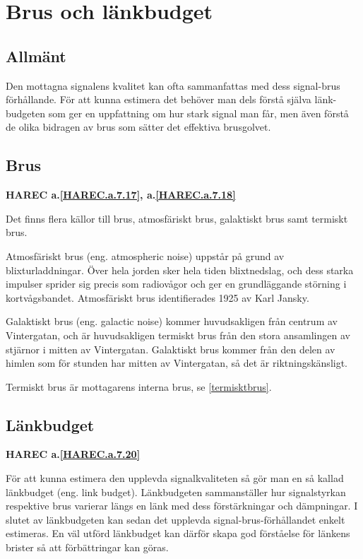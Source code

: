 \section{Brus och länkbudget}

\subsection{Allmänt}

Den mottagna signalens kvalitet kan ofta sammanfattas med dess signal-brus
förhållande.
För att kunna estimera det behöver man dels förstå själva länk-budgeten som
ger en uppfattning om hur stark signal man får, men även förstå de olika
bidragen av brus som sätter det effektiva brusgolvet.

\subsection{Brus}
\textbf{HAREC a.\ref{HAREC.a.7.17}\label{myHAREC.a.7.17}, a.\ref{HAREC.a.7.18}\label{myHAREC.a.7.18}}

Det finns flera källor till brus, atmosfäriskt brus, galaktiskt brus samt
termiskt brus.

Atmosfäriskt brus (eng. atmospheric noise) uppstår på grund av blixturladdningar.
Över hela jorden sker hela tiden blixtnedslag, och dess starka impulser sprider
sig precis som radiovågor och ger en grundläggande störning i kortvågsbandet.
Atmosfäriskt brus identifierades 1925 av Karl Jansky.

Galaktiskt brus (eng. galactic noise) kommer huvudsakligen från centrum av
Vintergatan, och är huvudsakligen termiskt brus från den stora ansamlingen av
stjärnor i mitten av Vintergatan.
Galaktiskt brus kommer från den delen av himlen som för stunden har mitten av
Vintergatan, så det är riktningskänsligt.

Termiskt brus är mottagarens interna brus, se \ref{termisktbrus}.

\subsection{Länkbudget}
\textbf{HAREC a.\ref{HAREC.a.7.20}\label{myHAREC.a.7.20}}

För att kunna estimera den upplevda signalkvaliteten så gör man en så kallad
länkbudget (eng. link budget).
Länkbudgeten sammanställer hur signalstyrkan respektive brus varierar längs en
länk med dess förstärkningar och dämpningar.
I slutet av länkbudgeten kan sedan det upplevda signal-brus-förhållandet
enkelt estimeras.
En väl utförd länkbudget kan därför skapa god förståelse för länkens brister
så att förbättringar kan göras.

